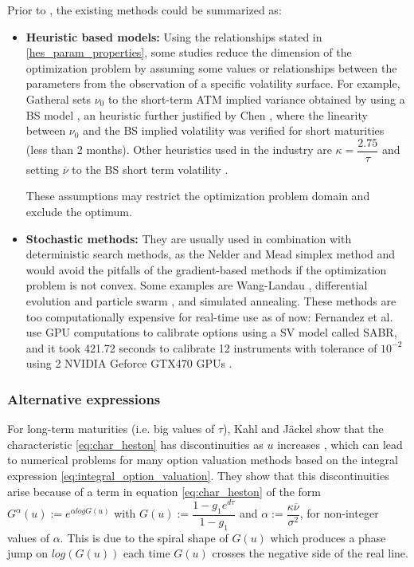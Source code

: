 \documentclass[12,twoside]{mammeTFM}
\theoremstyle{definition}
\theoremstyle{remark}
\newcommand{\vega}{\nu}
\begin{document}
Prior to \cite{cui17}, the existing methods could be summarized as:

\begin{itemize}
\item{\textbf{Heuristic based models:}}
Using the relationships stated in \ref{hes_param_properties}, some studies reduce the dimension of the optimization problem by assuming some values or relationships between the parameters from the observation of a specific volatility surface. For example, Gatheral sets $\nu_0$ to the short-term ATM implied variance obtained by using a BS model \cite{gat06}, an heuristic further justified by Chen \cite{che07}, where the linearity between $\nu_0$ and the BS implied volatility was verified for short maturities (less than 2 months). Other heuristics used in the industry are $\kappa = \dfrac{2.75}{\tau}$ and setting $\overline{\nu}$ to the BS short term volatility \cite{cla11}.

These assumptions may restrict the optimization problem domain and exclude the optimum.
\item{\textbf{Stochastic methods:}}
They are usually used in combination with deterministic search methods, as the Nelder and Mead simplex method \cite{lag98} and would avoid the pitfalls of the gradient-based methods if the optimization problem is not convex. Some examples are Wang-Landau \cite{che07}, differential evolution and particle swarm \cite{gil12_2}, and simulated annealing.
These methods are too computationally expensive for real-time use as of now: Fernandez et al. use GPU computations to calibrate options using a SV model called SABR, and it took 421.72 seconds to calibrate 12 instruments with tolerance of $10^{-2}$ using 2 NVIDIA Geforce GTX470 GPUs \cite{fer13}.


\end{itemize}

\subsubsection{Alternative expressions}

For long-term maturities (i.e. big values of $\tau$), Kahl and J\"{a}ckel show that the characteristic  \ref{eq:char_heston} has discontinuities as $u$ increases \cite{kal06}, which can lead to numerical problems for many option valuation methods based on the integral expression \ref{eq:integral_option_valuation}. They show that this discontinuities arise because of a term in equation \ref{eq:char_heston} of the form $G^\alpha(u) := e^{\alpha log G(u)}$ with $G(u) := \dfrac{1 - g_1 e^{d\tau}}{1 - g_1}$ and $\alpha := \dfrac{\kappa \overline{\vega}}{\sigma^2}$, for non-integer values of $\alpha$. This is due to the spiral shape of $G(u)$ which produces a phase jump on $log(G(u))$ each time $G(u)$ crosses the negative side of the real line.
\end{document}
